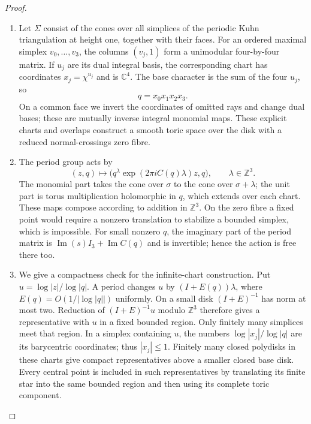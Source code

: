 \documentclass[11pt,a4paper]{article}
\theoremstyle{definition}
\begin{document}
\begin{proof}
\begin{enumerate}[label=\arabic*.]
\item Let $\Sigma$ consist of the cones over all simplices of the periodic
Kuhn triangulation at height one, together with their faces.  For an
ordered maximal simplex $v_0,\ldots,v_3$, the columns $(v_j,1)$ form a
unimodular four-by-four matrix.  If $u_j$ are its dual integral basis,
the corresponding chart has coordinates $x_j=\chi^{u_j}$ and is
$\mathbb C^4$.  The base character is the sum of the four $u_j$, so
\[
q=x_0x_1x_2x_3.
\]
On a common face we invert the coordinates of omitted rays and change
dual bases; these are mutually inverse integral monomial maps.  These
explicit charts and overlaps construct a smooth toric space over the
disk with a reduced normal-crossings zero fibre.

\item The period group acts by
\[
(z,q)\longmapsto
\bigl(q^\lambda\exp(2\pi iC(q)\lambda)z,q\bigr),
\qquad \lambda\in\mathbb Z^3.
\]
The monomial part takes the cone over $\sigma$ to the cone over
$\sigma+\lambda$; the unit part is torus multiplication holomorphic in
$q$, which extends over each chart.  These maps compose according to
addition in $\mathbb Z^3$.  On the zero fibre a fixed point would
require a nonzero translation to stabilize a bounded simplex, which
is impossible.  For small nonzero $q$, the imaginary part of the
period matrix is $\operatorname{Im}(s)I_3+\operatorname{Im}C(q)$ and
is invertible; hence the action is free there too.

\item We give a compactness check for the infinite-chart construction.  Put
$u=\log|z|/\log|q|$.  A period changes $u$ by
$(I+E(q))\lambda$, where $E(q)=O(1/|\log|q||)$ uniformly.
On a small disk $(I+E)^{-1}$ has norm at most two.  Reduction of
$(I+E)^{-1}u$ modulo $\mathbb Z^3$ therefore gives a representative
with $u$ in a fixed bounded region.  Only finitely many simplices
meet that region.  In a simplex containing $u$, the numbers
$\log|x_j|/\log|q|$ are its barycentric coordinates; thus
$|x_j|\leq1$.  Finitely many closed polydisks in these charts give
compact representatives above a smaller closed base disk.  Every
central point is included in such representatives by translating its
finite star into the same bounded region and then using its complete
toric component.


\end{enumerate}
\end{proof}
\end{document}
